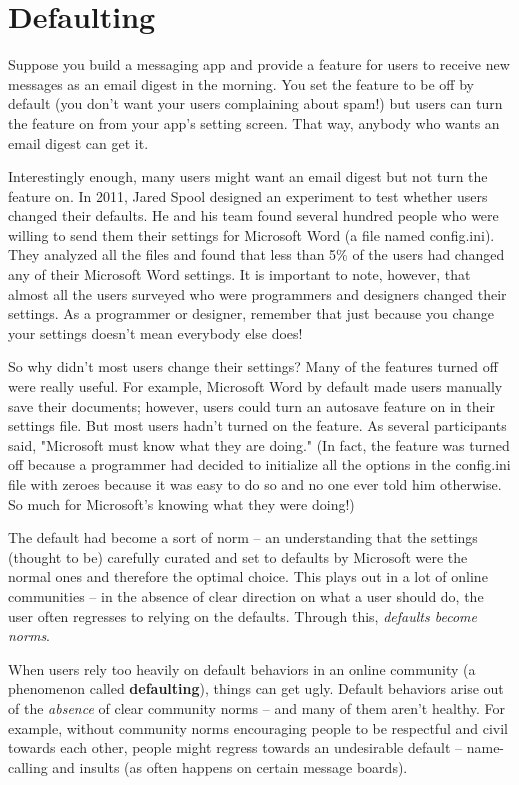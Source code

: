 \documentclass[class=book, crop=false]{standalone}
\begin{document}
\section{Defaulting}

Suppose you build a messaging app and provide a feature for users to receive new messages as an email digest in the morning. You set the feature to be off by default (you don't want your users complaining about spam!) but users can turn the feature on from your app's setting screen. That way, anybody who wants an email digest can get it.

Interestingly enough, many users might want an email digest but not turn the feature on. In 2011, Jared Spool designed an experiment to test whether users changed their defaults. He and his team found several hundred people who were willing to send them their settings for Microsoft Word (a file named config.ini). They analyzed all the files and found that less than 5\% of the users had changed any of their Microsoft Word settings. It is important to note, however, that almost all the users surveyed who were programmers and designers changed their settings. As a programmer or designer, remember that just because you change your settings doesn't mean everybody else does!

So why didn't most users change their settings? Many of the features turned off were really useful. For example, Microsoft Word by default made users manually save their documents; however, users could turn an autosave feature on in their settings file. But most users hadn't turned on the feature. As several participants said, "Microsoft must know what they are doing." (In fact, the feature was turned off because a programmer had decided to initialize all the options in the config.ini file with zeroes because it was easy to do so and no one ever told him otherwise. So much for Microsoft's knowing what they were doing!)

The default had become a sort of norm -- an understanding that the settings (thought to be) carefully curated and set to defaults by Microsoft were the normal ones and therefore the optimal choice. This plays out in a lot of online communities -- in the absence of clear direction on what a user should do, the user often regresses to relying on the defaults. Through this, \textit{defaults become norms}.

When users rely too heavily on default behaviors in an online community (a phenomenon called \textbf{defaulting}), things can get ugly. Default behaviors arise out of the \textit{absence} of clear community norms -- and many of them aren't healthy. For example, without community norms encouraging people to be respectful and civil towards each other, people might regress towards an undesirable default -- name-calling and insults (as often happens on certain message boards).
\end{document}
